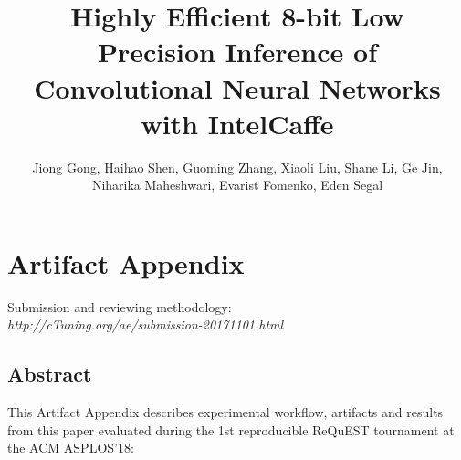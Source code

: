 \documentclass[sigplan]{acmart}
\begin{document}
\title{Highly Efficient 8-bit Low Precision Inference of Convolutional Neural Networks with IntelCaffe}

\author{Jiong Gong, Haihao Shen, Guoming Zhang, Xiaoli Liu, Shane Li, Ge Jin, Niharika Maheshwari, Evarist Fomenko, Eden Segal}

\renewcommand{\shortauthors}{}
\renewcommand{\shorttitle}{}

\begin{abstract}

\end{abstract}


\maketitle






\newpage

\onecolumn

\appendix
\section{Artifact Appendix}

Submission and reviewing methodology: \\
{\em http://cTuning.org/ae/submission-20171101.html}

\subsection{Abstract}

This Artifact Appendix describes experimental workflow,
artifacts and results from this paper evaluated 
during the 1st reproducible ReQuEST tournament at the ACM ASPLOS'18:
\end{document}
